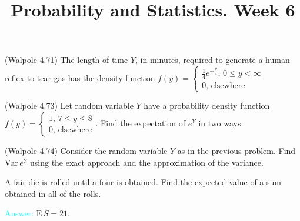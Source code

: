 \documentclass[14pt]{exam}
\title{Probability and Statistics. Week 6}
\date{}
\def\Var{{\textrm{Var}}\,}
\def\E{{\textrm{E}}\,}
\begin{document}
	\maketitle
	
	
	\begin{questions}
		\question
		(Walpole 4.71) The length of time $Y$, in minutes, required to generate a human reflex to tear gas has the density function $f(y) = \begin{cases}
			\frac{1}{4}e^{-\frac{y}{4}},\, 0\leq y < \infty\\
			0,\,\text{elsewhere}
		\end{cases}$
		
		
		\question
		(Walpole 4.73) Let random variable $Y$ have a probability density function $f(y) = \begin{cases}
			1,\,7\leq y\leq 8\\
			0,\,\text{elsewhere}
		\end{cases}$. Find the expectation of $e^Y$ in two ways:
		
		
		\question
		(Walpole 4.74) Consider the random variable $Y$ as in the previous problem. Find $\Var e^Y$ using the exact approach and the approximation of the variance.
		
		\question
		A fair die is rolled until a four is obtained. Find the expected value of a sum obtained in all of the rolls.
		
		\textcolor{cyan}{Answer:} $\E S = 21$.
		

\end{questions}
\end{document}
